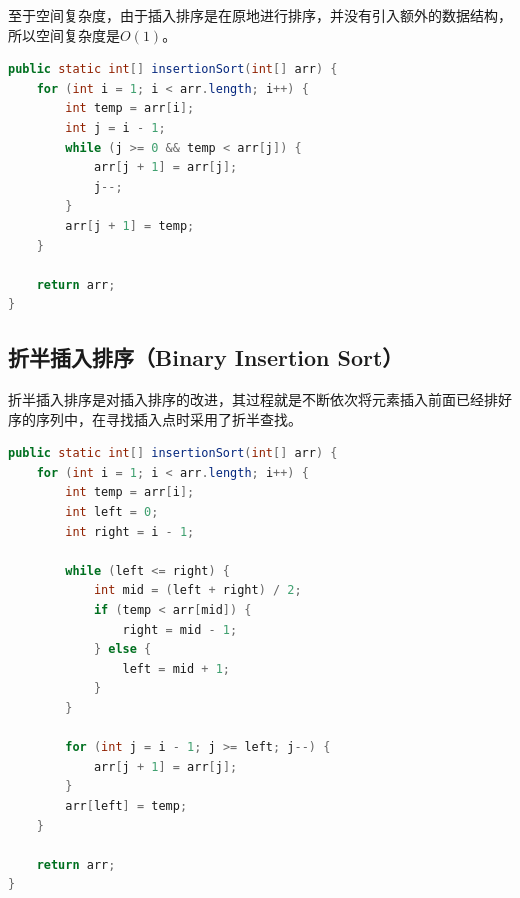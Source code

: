 至于空间复杂度，由于插入排序是在原地进行排序，并没有引入额外的数据结构，所以空间复杂度是$ O(1) $。

\begin{table}[H]
	\centering
	\caption{插入排序算法分析}
\end{table}


\begin{lstlisting}[language=Java]
public static int[] insertionSort(int[] arr) {
	for (int i = 1; i < arr.length; i++) {
		int temp = arr[i];
		int j = i - 1;
		while (j >= 0 && temp < arr[j]) {
			arr[j + 1] = arr[j];
			j--;
		}
		arr[j + 1] = temp;
	}

	return arr;
}
\end{lstlisting}

\vspace{0.5cm}

\subsection{折半插入排序（Binary Insertion Sort）}

折半插入排序是对插入排序的改进，其过程就是不断依次将元素插入前面已经排好序的序列中，在寻找插入点时采用了折半查找。\\


\begin{lstlisting}[language=Java]
public static int[] insertionSort(int[] arr) {
	for (int i = 1; i < arr.length; i++) {
		int temp = arr[i];
		int left = 0;
		int right = i - 1;

		while (left <= right) {
			int mid = (left + right) / 2;
			if (temp < arr[mid]) {
				right = mid - 1;
			} else {
				left = mid + 1;
			}
		}

		for (int j = i - 1; j >= left; j--) {
			arr[j + 1] = arr[j];
		}
		arr[left] = temp;
	}

	return arr;
}
\end{lstlisting}

\newpage

